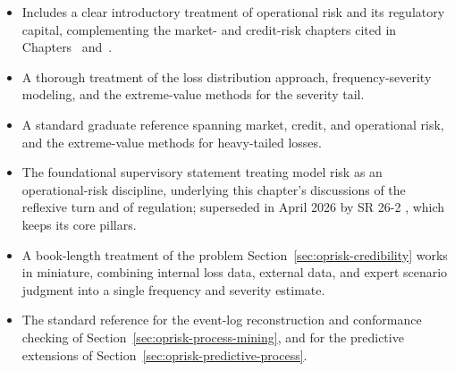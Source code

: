 \documentclass[../ai_in_finance]{subfiles}
\begin{document}
\begin{itemize}
\item {} Includes a clear introductory treatment of operational risk and its regulatory capital, complementing the market- and credit-risk chapters cited in Chapters~ and~.
\item {} A thorough treatment of the loss distribution approach, frequency-severity modeling, and the extreme-value methods for the severity tail.
\item {} A standard graduate reference spanning market, credit, and operational risk, and the extreme-value methods for heavy-tailed losses.
\item {} The foundational supervisory statement treating model risk as an operational-risk discipline, underlying this chapter's discussions of the reflexive turn and of regulation; superseded in April 2026 by SR 26-2 \parencite{frb2026revised}, which keeps its core pillars.
\item {} A book-length treatment of the problem Section~\ref{sec:oprisk-credibility} works in miniature, combining internal loss data, external data, and expert scenario judgment into a single frequency and severity estimate.
\item {} The standard reference for the event-log reconstruction and conformance checking of Section~\ref{sec:oprisk-process-mining}, and for the predictive extensions of Section~\ref{sec:oprisk-predictive-process}.
\end{itemize}
\end{document}
